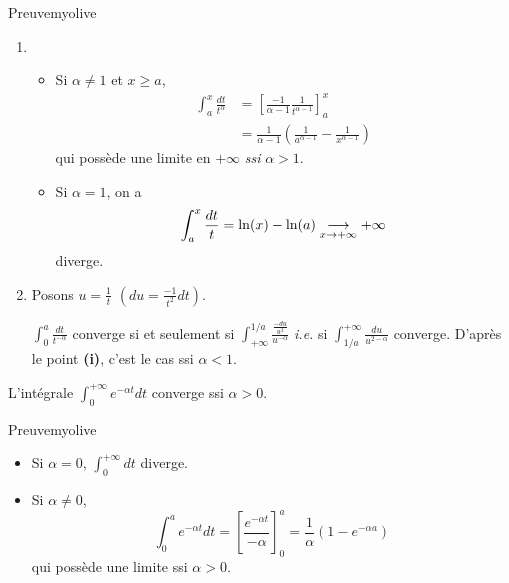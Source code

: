     \begin{demo}{Preuve}{myolive}
        \begin{enumerate}
            \item \begin{itemize}
                \item Si $\alpha \neq 1$ et $x \geq a$, 
                \begin{align*}
                    \int_{a}^{x} \frac{dt}{t^{\alpha}} 
                    &= \left[ \frac{-1}{\alpha-1} \frac{1}{t^{\alpha-1}} \right]_a^x \\
                    &= \frac{1}{\alpha-1}\left( \frac{1}{a^{\alpha-1}} - \frac{1}{x^{\alpha-1}} \right)
                \end{align*}
                qui possède une limite en $+\infty$ \textit{ssi} $\alpha > 1$.
                \item Si $\alpha = 1$, on a 
                \[ \int_{a}^{x} \frac{dt}{t} = \ln(x)-\ln(a) \underset{x \rightarrow +\infty}{\longrightarrow} +\infty \]   
                diverge.
            \end{itemize}
            \item Posons $u = \frac{1}{t}$ $\left(du = \frac{-1}{t^2} dt\right)$.
            
            $\int_{0}^{a} \frac{dt}{t^{-\alpha}}$ converge si et seulement si $\int_{+\infty}^{1/a} \frac{\frac{-du}{u^2}}{u^{-\alpha}}$ \textit{i.e.} si $\int_{1/a}^{+\infty} \frac{du}{u^{2-\alpha}}$ converge. D’après le point \textbf{(i)}, c’est le cas ssi $\alpha < 1$.
        \end{enumerate}
    \end{demo}

    \begin{prop}{}{}
        L’intégrale $\int_{0}^{+\infty} e^{-\alpha t} dt$ converge ssi $\alpha > 0$.
    \end{prop}

    \begin{demo}{Preuve}{myolive}
        \begin{itemize}
            \item Si $\alpha = 0$, $\int_{0}^{+\infty} dt$ diverge.
            \item Si $\alpha \neq 0$, 
            \[ \int_{0}^{a} e^{-\alpha t}dt = \left[\frac{e^{-\alpha t}}{-\alpha}\right]_0^a = \frac{1}{\alpha} \left( 1 - e^{-\alpha a} \right) \]   
            qui possède une limite ssi $\alpha > 0$.
        \end{itemize}
    \end{demo}

